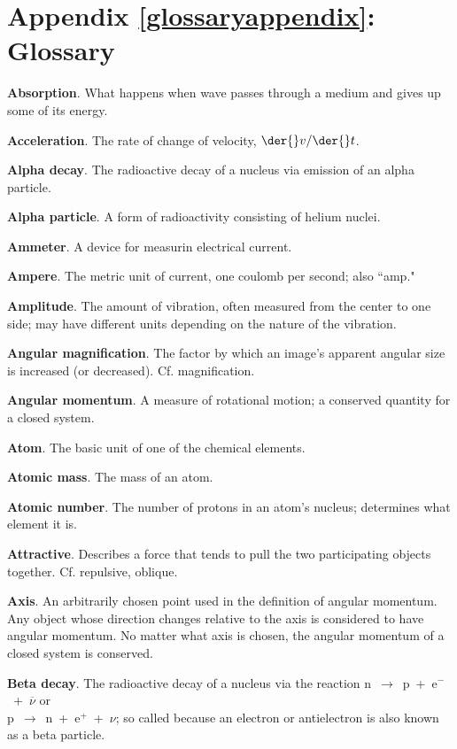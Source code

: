\label{glossaryappendix}%
\appendix\chapter{Appendix \ref{glossaryappendix}: Glossary}

\textbf{Absorption}. What happens when wave passes through a medium and gives up some of its energy. 

\textbf{Acceleration}. The rate of change of velocity, $\der{}v/\der{}t$. 

\textbf{Alpha decay}. The radioactive decay of a nucleus via emission of an alpha particle.


\textbf{Alpha particle}. A form of radioactivity consisting of helium nuclei. 

\textbf{Ammeter}. A device for measurin electrical current. 

\textbf{Ampere}. The metric unit of current, one coulomb per second; also ``amp."


\textbf{Amplitude}. The amount of vibration, often measured from the center to one side; may have different
units
depending on the nature of the vibration. 

\textbf{Angular magnification}. The factor by which an image's apparent angular size is increased (or
decreased). Cf. magnification. 

\textbf{Angular momentum}. A measure of rotational motion; a conserved quantity for a closed system. 

\textbf{Atom}. The basic unit of one of the chemical elements. 

\textbf{Atomic mass}. The mass of an atom. 

\textbf{Atomic number}. The number of protons in an atom's nucleus; determines what element it is. 

\textbf{Attractive}. Describes a force that tends to pull the two participating objects together. Cf.
repulsive, oblique.


\textbf{Axis}. An arbitrarily chosen point used in the definition of angular momentum. Any object whose
direction changes
relative to the axis is considered to have angular momentum. No matter what axis is chosen, the angular
momentum of a
closed system is conserved. 

\textbf{Beta decay}. The radioactive decay of a nucleus via the reaction \mbox{n $\to$ p + e$^{-}$ + $\overline \nu $} or\\
\mbox{p $\to$ n + e$^{+}$ + $\nu$}; so
called because an electron or antielectron is also known as a beta particle. 

